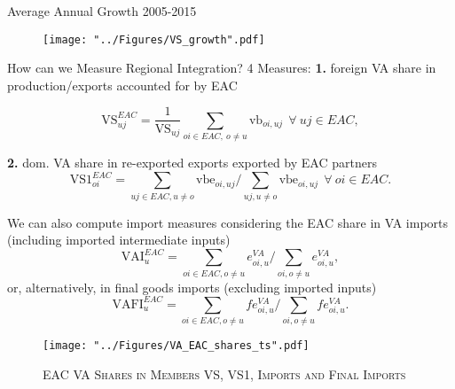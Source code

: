 \documentclass[compress]{beamer}
\newenvironment{noheadline}{
    \setbeamertemplate{headline}{}
    \addtobeamertemplate{frametitle}{\vspace*{-0.9\baselineskip}}{}
}{}
\begin{document}
\begin{noheadline}
\begin{frame}{Average Annual Growth 2005-2015}
\begin{figure}[h!]
\centering
\texttt{[image: "../Figures/VS\_growth".pdf]} %
\end{figure}
\end{frame}

\begin{frame}{How can we Measure Regional Integration? 4 Measures:}
\textbf{1.} foreign VA share in production/exports accounted for by EAC

\begin{equation} \label{eq:VS_EAC}
\text{VS}_{uj}^{EAC} = \frac{1}{\text{VS}_{uj}}  \sum_{oi \in EAC,\ o \neq  u} \text{vb}_{oi, uj}   \ \ \forall\ uj \in EAC,
\end{equation}

\textbf{2.} dom. VA share in re-exported exports exported by EAC partners 
\begin{equation} \label{eq:VS1_EAC}
\text{VS1}_{oi}^{EAC} =  \sum_{uj \in EAC, u \neq  o} \text{vbe}_{oi, uj} \bigg/ \sum_{uj, u \neq  o} \text{vbe}_{oi, uj}\ \ \forall\ oi \in EAC.
\end{equation}

We can also compute import measures considering the EAC share in VA imports (including imported intermediate inputs)
\begin{equation}
\text{VAI}_u^{EAC} = \sum_{oi \in EAC, o \neq u}  e_{oi, u}^{VA}  \bigg/ \sum_{oi, o \neq u}  e_{oi, u}^{VA},  
\end{equation}
or, alternatively, in final goods imports (excluding imported inputs)
\begin{equation}
\text{VAFI}_{u}^{EAC} = \sum_{oi \in EAC, o \neq u}  fe_{oi, u}^{VA}  \bigg/ \sum_{oi, o \neq u}  fe_{oi, u}^{VA}.
\end{equation}
\end{frame}
\end{noheadline}

\begin{frame}
\begin{figure}[h!]
\centering
\caption{\label{fig:VAEACshares}\textsc{EAC VA Shares in Members VS, VS1, Imports and Final Imports}}
\texttt{[image: "../Figures/VA\_EAC\_shares\_ts".pdf]} %
\end{figure}
\end{frame}
\end{document}
